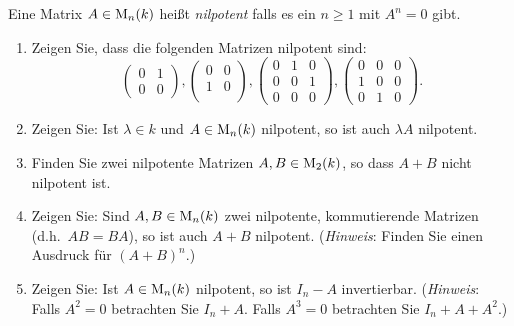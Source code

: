 \begin{question}
 Eine Matrix $A \in \operatorname{M}_n(k)$ heißt \emph{nilpotent} falls es ein $n \geq 1$ mit $A^n = 0$ gibt.
 \begin{enumerate}
  \item
   Zeigen Sie, dass die folgenden Matrizen nilpotent sind:
   \[
    \begin{pmatrix}
     0 & 1 \\
     0 & 0
    \end{pmatrix},
    \begin{pmatrix}
     0 & 0 \\
     1 & 0 \\
    \end{pmatrix},
    \begin{pmatrix}
     0 & 1 & 0 \\
     0 & 0 & 1 \\
     0 & 0 & 0
    \end{pmatrix},
    \begin{pmatrix}
     0 & 0 & 0 \\
     1 & 0 & 0 \\
     0 & 1 & 0
    \end{pmatrix}.
   \]
  \item
   Zeigen Sie: Ist $\lambda \in k$ und $A \in \operatorname{M}_n(k)$ nilpotent, so ist auch $\lambda A$ nilpotent.
  \item
   Finden Sie zwei nilpotente Matrizen $A, B \in \operatorname{M}_2(k)$, so dass $A+B$ nicht nilpotent ist.
  \item
   Zeigen Sie: Sind $A,B \in \operatorname{M}_n(k)$ zwei nilpotente, kommutierende Matrizen (d.h.\ $AB = BA$), so ist auch $A+B$ nilpotent. (\emph{Hinweis}: Finden Sie einen Ausdruck für $(A+B)^n$.)
  \item
   Zeigen Sie: Ist $A \in \operatorname{M}_n(k)$ nilpotent, so ist $I_n - A$ invertierbar. (\emph{Hinweis}: Falls $A^2 = 0$ betrachten Sie $I_n + A$. Falls $A^3 = 0$ betrachten Sie $I_n + A + A^2$.)
 \end{enumerate}
\end{question}
